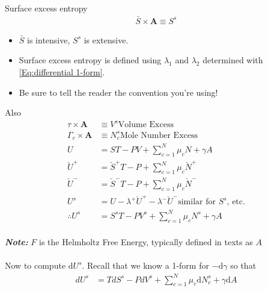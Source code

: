 \documentclass{article}
\renewcommand{\d}{\mathrm{d}}
\newcommand{\matr}[1]{\bm{#1}}
\newcommand{\note}[1]{\\\textbf{\textit{Note: }}#1\\\\}
\begin{document}
\begin{section}{Surface excess entropy}
	\begin{align*}
		\bar{S}\times \matr{A} \equiv S^s
	\end{align*}
  \begin{itemize}
    \item $\bar{S}$ is intensive, $S^s$ is extensive.
    \item Surface excess entropy is defined using $\lambda_1$ and $\lambda_2$ determined with \eqref{Eq:differential 1-form}.
    \item Be sure to tell the reader the convention you're using!
  \end{itemize}
  Also 
  \begin{align*}
	  \tau\times \matr{A} &\equiv V^s \text{Volume Excess}\\
	  \Gamma_c\times \matr{A} &\equiv N_c^s \text{Mole Number Excess}\\
    U &= ST - PV + \sum_{c=1}^N \mu_c N + \gamma A\\
    \check{U}^{+} &= \check S^{+}T - P + \sum_{c=1}^N \mu_c \check N^{+}\\
    \check{U}^{-} &= \check S^{-}T - P + \sum_{c=1}^N \mu_c \check N^{-}\\
    U^s &= U - \lambda^{+}\check U^{+} -\lambda^{-} \check U^{-} \text{similar for }S^s\text{, etc.}\\
    \therefore U^s &= S^s T - P V^s + \sum_{c=1}^N \mu_c N^s + \gamma A
  \end{align*}
  \note{$F$ is the Helmholtz Free Energy, typically defined in texts as $A$}
  Now to compute $\d U^s$. Recall that we know a 1-form for $-\d \gamma$ so that 
  \begin{align*}
    dU^s &= T dS^s - P dV^s + \sum_{c=1}^N \mu_c \d N_c^s + \gamma \d A\\
  \end{align*}


\end{section}
\end{document}
